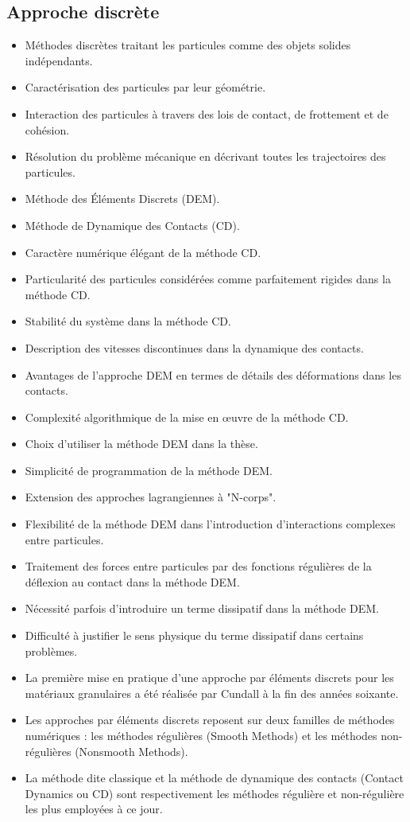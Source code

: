 \subsection{Approche discrète}
\begin{itemize}
    \item Méthodes discrètes traitant les particules comme des objets solides indépendants.
    \item Caractérisation des particules par leur géométrie.
    \item Interaction des particules à travers des lois de contact, de frottement et de cohésion.
    \item Résolution du problème mécanique en décrivant toutes les trajectoires des particules.
    \item Méthode des Éléments Discrets (DEM).
    \item Méthode de Dynamique des Contacts (CD).
    \item Caractère numérique élégant de la méthode CD.
    \item Particularité des particules considérées comme parfaitement rigides dans la méthode CD.
    \item Stabilité du système dans la méthode CD.
    \item Description des vitesses discontinues dans la dynamique des contacts.
    \item Avantages de l'approche DEM en termes de détails des déformations dans les contacts.
    \item Complexité algorithmique de la mise en œuvre de la méthode CD.
    \item Choix d'utiliser la méthode DEM dans la thèse.
    \item Simplicité de programmation de la méthode DEM.
    \item Extension des approches lagrangiennes à "N-corps".
    \item Flexibilité de la méthode DEM dans l'introduction d'interactions complexes entre particules.
    \item Traitement des forces entre particules par des fonctions régulières de la déflexion au contact dans la méthode DEM.
    \item Nécessité parfois d'introduire un terme dissipatif dans la méthode DEM.
    \item Difficulté à justifier le sens physique du terme dissipatif dans certains problèmes.
    \item La première mise en pratique d'une approche par éléments discrets pour les matériaux granulaires a été réalisée par Cundall à la fin des années soixante.
    \item Les approches par éléments discrets reposent sur deux familles de méthodes numériques : les méthodes régulières (Smooth Methods) et les méthodes non-régulières (Nonsmooth Methods).
    \item La méthode dite classique et la méthode de dynamique des contacts (Contact Dynamics ou CD) sont respectivement les méthodes régulière et non-régulière les plus employées à ce jour.
\end{itemize}
